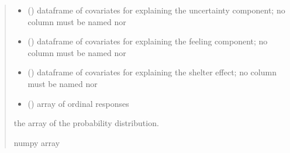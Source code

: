 \documentclass[letterpaper,10pt,english]{sphinxmanual}
\begin{document}
\begin{fulllineitems}
\begin{quote}
\begin{description}
\begin{itemize}
\item {} 
\sphinxAtStartPar
{} () \textendash{} dataframe of covariates for explaining the uncertainty component;
no column must be named  nor 

\item {} 
\sphinxAtStartPar
{} () \textendash{} dataframe of covariates for explaining the feeling component;
no column must be named  nor 

\item {} 
\sphinxAtStartPar
{} () \textendash{} dataframe of covariates for explaining the shelter effect;
no column must be named  nor 

\item {} 
\sphinxAtStartPar
{} () \textendash{} array of ordinal responses

\end{itemize}

\sphinxAtStartPar
the array of the probability distribution.

\sphinxAtStartPar
numpy array

\end{description}\end{quote}

\end{fulllineitems}

\end{document}
